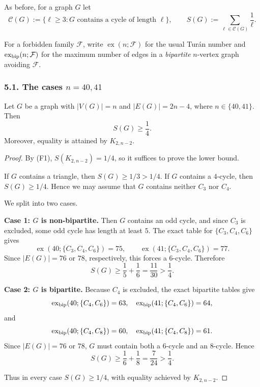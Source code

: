 As before, for a graph $G$ let
\[
\mathcal C(G):=\{\ell\ge 3 : \text{$G$ contains a cycle of length $\ell$}\},
\qquad
S(G):=\sum_{\ell\in\mathcal C(G)}\frac1\ell.
\]

For a forbidden family $\mathcal F$, write $\operatorname{ex}(n;\mathcal F)$ for the usual Tur\'an number and
$\operatorname{ex}_{\rm bip}(n;\mathcal F)$ for the maximum number of edges in a \emph{bipartite} $n$-vertex graph avoiding $\mathcal F$.

\subsubsection*{5.1. The cases $n=40,41$}

\begin{proposition}[The line $m=2n-4$ at $n=40,41$]\label{prop:40-41}
Let $G$ be a graph with $|V(G)|=n$ and $|E(G)|=2n-4$, where $n\in\{40,41\}$.
Then
\[
S(G)\ge \frac14.
\]
Moreover, equality is attained by $K_{2,n-2}$.
\end{proposition}

\begin{proof}
By (F1), $S(K_{2,n-2})=1/4$, so it suffices to prove the lower bound.

If $G$ contains a triangle, then $S(G)\ge 1/3>1/4$.
If $G$ contains a $4$-cycle, then $S(G)\ge 1/4$.
Hence we may assume that $G$ contains neither $C_3$ nor $C_4$.

We split into two cases.

\medskip
\noindent\textbf{Case 1: $G$ is non-bipartite.}
Then $G$ contains an odd cycle, and since $C_3$ is excluded, some odd cycle has length at least $5$.
The exact table for $\{C_3,C_4,C_6\}$ gives
\[
\operatorname{ex}(40;\{C_3,C_4,C_6\})=75,\qquad
\operatorname{ex}(41;\{C_3,C_4,C_6\})=77.
\]
Since $|E(G)|=76$ or $78$, respectively, this forces a $6$-cycle.
Therefore
\[
S(G)\ge \frac15+\frac16=\frac{11}{30}>\frac14.
\]

\medskip
\noindent\textbf{Case 2: $G$ is bipartite.}
Because $C_4$ is excluded, the exact bipartite tables give
\[
\operatorname{ex}_{\rm bip}(40;\{C_4,C_6\})=63,\quad
\operatorname{ex}_{\rm bip}(41;\{C_4,C_6\})=64,
\]
and
\[
\operatorname{ex}_{\rm bip}(40;\{C_4,C_8\})=60,\quad
\operatorname{ex}_{\rm bip}(41;\{C_4,C_8\})=61.
\]
Since $|E(G)|=76$ or $78$, $G$ must contain both a $6$-cycle and an $8$-cycle.
Hence
\[
S(G)\ge \frac16+\frac18=\frac7{24}>\frac14.
\]

Thus in every case $S(G)\ge 1/4$, with equality achieved by $K_{2,n-2}$.
\end{proof}


